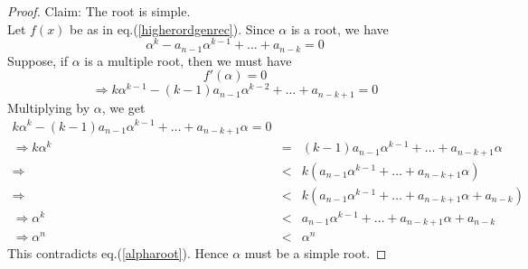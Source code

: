 \begin{multicols}{2}
\begin{proof}
Claim: The root is simple. \\
Let $f(x)$ be as in eq.(\ref{higherordgenrec}). Since $\alpha$ is a root, we have
 \begin{equation}
\alpha^k - a_{n-1}\alpha^{k-1} + \ldots + a_{n-k} = 0\label{eq-11.3}
 \end{equation}
Suppose, if $\alpha$ is a multiple root, then we must have
\begin{equation}
 f'(\alpha) = 0 \label{eq-11.4}
\end{equation}
\begin{equation}
\Rightarrow k\alpha^{k-1}-(k-1)a_{n-1}\alpha^{k-2} + \ldots + a_{n-k+1} = 0 \label{eq-11.5}
\end{equation}
Multiplying by $\alpha$, we get
\begin{eqnarray}
 k\alpha^{k} - (k-1)a_{n-1}\alpha^{k-1} + \ldots + a_{n-k+1}\alpha = 0\nonumber\\
 \Rightarrow  k\alpha^{k} &=& (k-1)a_{n-1}\alpha^{k-1} + \ldots + a_{n-k+1}\alpha\nonumber\\
 \Rightarrow   &<& k\left( a_{n-1}\alpha^{k-1} + \ldots +a_{n-k+1}\alpha \right)\nonumber\\
 \Rightarrow     &<& k\left( a_{n-1}\alpha^{k-1} + \ldots +a_{n-k+1}\alpha + a_{n-k}\right)\nonumber\\
 \Rightarrow \alpha^{k} &<&  a_{n-1}\alpha^{k-1} + \ldots + a_{n-k+1}\alpha + a_{n-k}\nonumber\\
 \Rightarrow\alpha^{n} &<& \alpha^{n} \nonumber
\end{eqnarray}
This contradicts eq.(\ref{alpharoot}). Hence $\alpha$ must be a simple root.



\end{proof}
\end{multicols}
